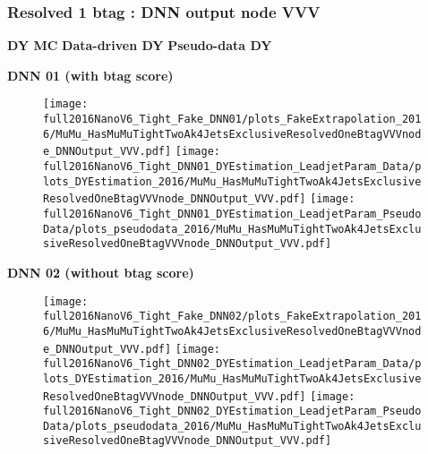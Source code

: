 \documentclass[9pt]{beamer}
\begin{document}
\begin{frame}
	\frametitle{Resolved 1 btag : DNN output node VVV}
    \hspace{2cm} \textbf{DY MC} \hspace{1.9cm} \textbf{Data-driven DY} \hspace{1cm} \textbf{Pseudo-data DY}
    \begin{center}
        \textbf{DNN 01 (with btag score)}
    \end{center}
	\begin{figure}
		\texttt{[image: full2016NanoV6\_Tight\_Fake\_DNN01/plots\_FakeExtrapolation\_2016/MuMu\_HasMuMuTightTwoAk4JetsExclusiveResolvedOneBtagVVVnode\_DNNOutput\_VVV.pdf]}
		\texttt{[image: full2016NanoV6\_Tight\_DNN01\_DYEstimation\_LeadjetParam\_Data/plots\_DYEstimation\_2016/MuMu\_HasMuMuTightTwoAk4JetsExclusiveResolvedOneBtagVVVnode\_DNNOutput\_VVV.pdf]}
		\texttt{[image: full2016NanoV6\_Tight\_DNN01\_DYEstimation\_LeadjetParam\_PseudoData/plots\_pseudodata\_2016/MuMu\_HasMuMuTightTwoAk4JetsExclusiveResolvedOneBtagVVVnode\_DNNOutput\_VVV.pdf]}
	\end{figure}
    \begin{center}
        \textbf{DNN 02 (without btag score)}
    \end{center}
	\begin{figure}
		\texttt{[image: full2016NanoV6\_Tight\_Fake\_DNN02/plots\_FakeExtrapolation\_2016/MuMu\_HasMuMuTightTwoAk4JetsExclusiveResolvedOneBtagVVVnode\_DNNOutput\_VVV.pdf]}
		\texttt{[image: full2016NanoV6\_Tight\_DNN02\_DYEstimation\_LeadjetParam\_Data/plots\_DYEstimation\_2016/MuMu\_HasMuMuTightTwoAk4JetsExclusiveResolvedOneBtagVVVnode\_DNNOutput\_VVV.pdf]}
		\texttt{[image: full2016NanoV6\_Tight\_DNN02\_DYEstimation\_LeadjetParam\_PseudoData/plots\_pseudodata\_2016/MuMu\_HasMuMuTightTwoAk4JetsExclusiveResolvedOneBtagVVVnode\_DNNOutput\_VVV.pdf]}
	\end{figure}
\end{frame}
\end{document}
